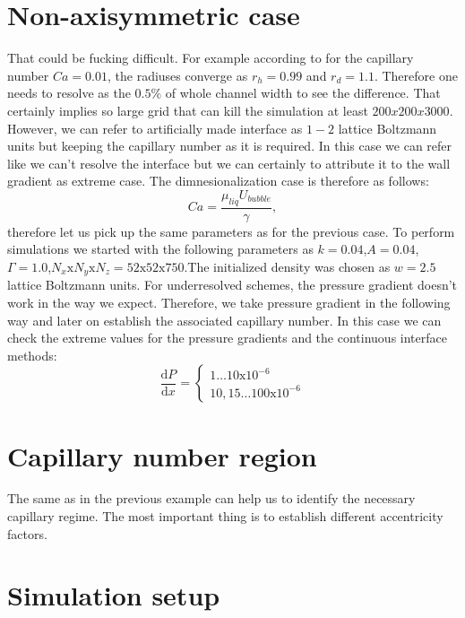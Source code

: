 \documentclass{article}
\begin{document}
\section{Non-axisymmetric case}
That could be fucking difficult. For example according to \cite{heil-threedim} for the capillary
number $Ca=0.01$, the radiuses converge as $r_h=0.99$ and $r_d=1.1$. Therefore one needs to resolve
as the $0.5\%$ of whole channel width to see the difference. That certainly implies so large grid
that can kill the simulation at least $200x200x3000$. However, we can refer to artificially made
interface as $1-2$ lattice Boltzmann units but keeping the capillary number as it is required. In
this case we can refer like we can't resolve the interface but we can certainly to attribute it to
the wall gradient as extreme case. The dimnesionalization case is therefore as follows:
\begin{equation}
Ca=\frac{\mu_{liq} U_{bubble}}{\gamma},
\end{equation}
therefore let us pick up the same parameters as for the previous case. To perform simulations we
started with the following parameters as
$k=0.04$,$A=0.04$,$\Gamma=1.0$,$N_x\mathrm{x}N_y\mathrm{x}N_z=52\mathrm{x}52\mathrm{x}750$.The
initialized density was chosen as $w=2.5$ lattice Boltzmann units. For underresolved schemes, the
pressure gradient doesn't work in the way we expect. Therefore, we take pressure gradient in the
following way and later on establish the associated capillary number. In this case we can check the
extreme values for the pressure gradients and the continuous interface methods:
\begin{equation}
\frac{\mathrm{d}P}{\mathrm{d}x}=
\begin{cases}
1\dots10\mathrm{x}10^{-6}\\
10,15\dots 100 \mathrm{x}10^{-6}
\end{cases}
\end{equation}

\section{Capillary number region}
The same as in the previous example can help us to identify the necessary capillary regime. The
most important thing is to establish different accentricity factors.
\section{Simulation setup}




\end{document}
